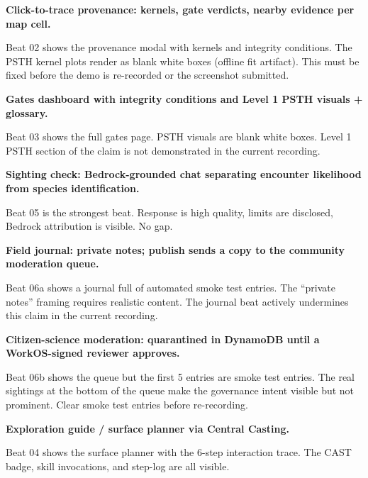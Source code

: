 \textbf{Click-to-trace provenance: kernels, gate verdicts, nearby evidence per map cell.}
\begin{notebox}
\OK{} Beat 02 shows the provenance modal with kernels and integrity conditions. \Po{} The PSTH kernel plots render as blank white boxes (offline fit artifact). This must be fixed before the demo is re-recorded or the screenshot submitted.
\end{notebox}

\textbf{Gates dashboard with integrity conditions and Level 1 PSTH visuals + glossary.}
\begin{notebox}
\OK{} Beat 03 shows the full gates page. \Po{} PSTH visuals are blank white boxes. Level 1 PSTH section of the claim is not demonstrated in the current recording.
\end{notebox}

\textbf{Sighting check: Bedrock-grounded chat separating encounter likelihood from species identification.}
\begin{notebox}
\OK{} Beat 05 is the strongest beat. Response is high quality, limits are disclosed, Bedrock attribution is visible. No gap.
\end{notebox}

\textbf{Field journal: private notes; publish sends a copy to the community moderation queue.}
\begin{notebox}
\Po{} Beat 06a shows a journal full of automated smoke test entries. The ``private notes'' framing requires realistic content. The journal beat actively undermines this claim in the current recording.
\end{notebox}

\textbf{Citizen-science moderation: quarantined in DynamoDB until a WorkOS-signed reviewer approves.}
\begin{notebox}
\Pp{} Beat 06b shows the queue but the first 5 entries are smoke test entries. The real sightings at the bottom of the queue make the governance intent visible but not prominent. Clear smoke test entries before re-recording.
\end{notebox}

\textbf{Exploration guide / surface planner via Central Casting.}
\begin{notebox}
\OK{} Beat 04 shows the surface planner with the 6-step interaction trace. The CAST badge, skill invocations, and step-log are all visible. 
\end{notebox}

